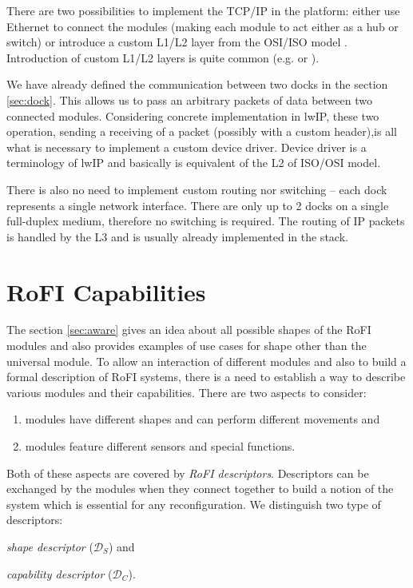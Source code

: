 There are two possibilities to implement the TCP/IP in the platform: either use
Ethernet to connect the modules (making each module to act either as a hub or
switch) or introduce a custom L1/L2 layer from the OSI/ISO model
\cite{braden_requirements_1989}. Introduction of custom L1/L2 layers is quite
common (e.g. \cite{lindgren_ip_2008} or \cite{waitzman_ip_1999}).

We have already defined the communication between two docks in the section
\ref{sec:dock}. This allows us to pass an arbitrary packets of data between two
connected modules. Considering concrete implementation in lwIP, these two
operation, sending a receiving of a packet (possibly with a custom header),is
all what is necessary to implement a custom device driver. Device driver is a
terminology of lwIP and basically is equivalent of the L2 of ISO/OSI model.

There is also no need to implement custom routing nor switching -- each dock
represents a single network interface. There are only up to 2 docks on a single
full-duplex medium, therefore no switching is required. The routing of IP
packets is handled by the L3 and is usually already implemented in the stack.


\section{RoFI Capabilities}\label{sec:capabilities}

The section \ref{sec:aware} gives an idea about all possible shapes of the RoFI
modules and also provides examples of use cases for shape other than the
universal module. To allow an interaction of different modules and also to build
a formal description of RoFI systems, there is a need to establish a way to
describe various modules and their capabilities. There are two aspects to
consider:
\begin{enumerate}
    \item modules have different shapes and can perform different movements and
    \item modules feature different sensors and special functions.
\end{enumerate}

Both of these aspects are covered by \emph{RoFI descriptors}. Descriptors can be
exchanged by the modules when they connect together to build a notion of the
system which is essential for any reconfiguration. We distinguish two type of
descriptors:
\begin{enumerate*}
    \item \emph{shape descriptor} ($\mathcal{D}_S$) and
    \item \emph{capability descriptor} ($\mathcal{D}_C$).
\end{enumerate*}

